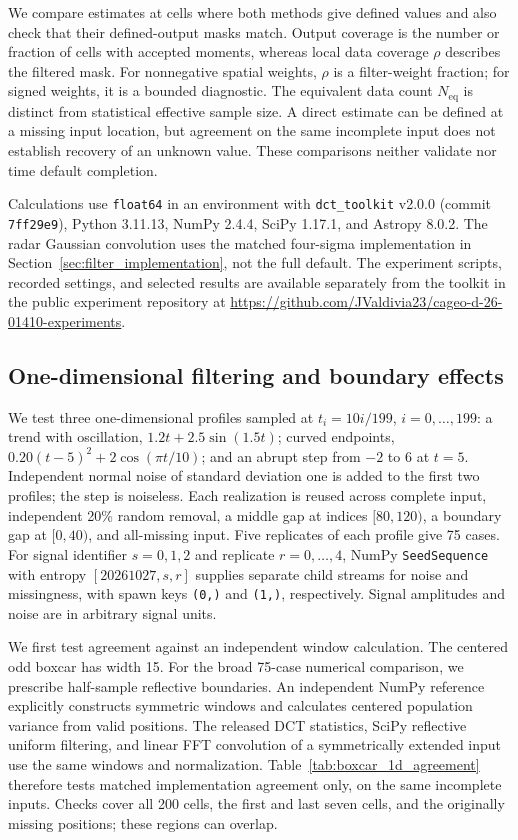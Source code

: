 \documentclass[a4paper,fleqn]{cas-sc}
\begin{document}
We compare estimates at cells where both methods give defined values and also check that their defined-output masks match. Output coverage is the number or fraction of cells with accepted moments, whereas local data coverage $\rho$ describes the filtered mask. For nonnegative spatial weights, $\rho$ is a filter-weight fraction; for signed weights, it is a bounded diagnostic. The equivalent data count $N_{\mathrm{eq}}$ is distinct from statistical effective sample size. A direct estimate can be defined at a missing input location, but agreement on the same incomplete input does not establish recovery of an unknown value. These comparisons neither validate nor time default completion.

Calculations use \texttt{float64} in an environment with \texttt{dct\_toolkit} v2.0.0 (commit \texttt{7ff29e9}), Python 3.11.13, NumPy 2.4.4, SciPy 1.17.1, and Astropy 8.0.2. The radar Gaussian convolution uses the matched four-sigma implementation in Section~\ref{sec:filter_implementation}, not the full default. The experiment scripts, recorded settings, and selected results are available separately from the toolkit in the public experiment repository at\newline
\url{https://github.com/JValdivia23/cageo-d-26-01410-experiments}.

\subsection{One-dimensional filtering and boundary effects}

We test three one-dimensional profiles sampled at $t_i=10i/199$, $i=0,\ldots,199$: a trend with oscillation, $1.2t+2.5\sin(1.5t)$; curved endpoints, $0.20(t-5)^2+2\cos(\pi t/10)$; and an abrupt step from $-2$ to $6$ at $t=5$. Independent normal noise of standard deviation one is added to the first two profiles; the step is noiseless. Each realization is reused across complete input, independent 20\% random removal, a middle gap at indices $[80,120)$, a boundary gap at $[0,40)$, and all-missing input. Five replicates of each profile give 75 cases. For signal identifier $s=0,1,2$ and replicate $r=0,\ldots,4$, NumPy \texttt{SeedSequence} with entropy $[20261027,s,r]$ supplies separate child streams for noise and missingness, with spawn keys \texttt{(0,)} and \texttt{(1,)}, respectively. Signal amplitudes and noise are in arbitrary signal units.

We first test agreement against an independent window calculation. The centered odd boxcar has width 15. For the broad 75-case numerical comparison, we prescribe half-sample reflective boundaries. An independent NumPy reference explicitly constructs symmetric windows and calculates centered population variance from valid positions. The released DCT statistics, SciPy reflective uniform filtering, and linear FFT convolution of a symmetrically extended input use the same windows and normalization. Table~\ref{tab:boxcar_1d_agreement} therefore tests matched implementation agreement only, on the same incomplete inputs. Checks cover all 200 cells, the first and last seven cells, and the originally missing positions; these regions can overlap.
\end{document}
